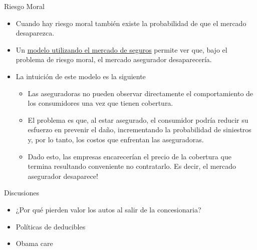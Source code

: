 \documentclass{beamer}
\begin{document}
\begin{frame}{Riesgo Moral}
\label{volver2}
    \begin{itemize}
        \item Cuando hay riesgo moral también existe la probabilidad de que el mercado desaparezca.
        \item Un \hyperlink{htres}{modelo utilizando el mercado de seguros} permite ver que, bajo el problema de riesgo moral, el mercado asegurador desaparecería.
        \item La intuición de este modelo es la siguiente
         \begin{itemize}
            \item Las aseguradoras no pueden observar directamente el comportamiento de los consumidores una vez que tienen cobertura.
            \item El problema es que, al estar asegurado, el consumidor podría reducir su esfuerzo en prevenir el daño, incrementando la probabilidad de siniestros y, por lo tanto, los costos que enfrentan las aseguradoras.
            \item Dado esto, las empresas encarecerían el precio de la cobertura que termina resultando conveniente no contratarlo. Es decir, el mercado asegurador desaparece!
        \end{itemize}
 
\end{itemize}
\end{frame}

\begin{frame}{Discusiones}
    \begin{itemize}
        \item ¿Por qué pierden valor los autos al salir de la concesionaria? \vspace{1mm}
        \item Políticas de deducibles \vspace{1mm}
        \item Obama care
    \end{itemize}
\end{frame}
\end{document}
